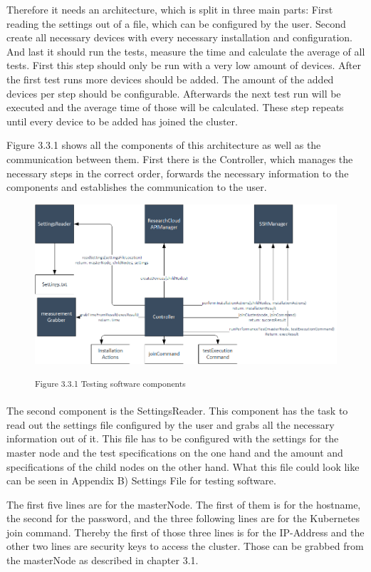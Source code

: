 Therefore it needs an architecture, which is split in three main parts: First reading the settings out of a file, which can be configured by the user. Second create all necessary devices with every necessary installation and configuration. And last it should run the tests, measure the time and calculate the average of all tests. First this step should only be run with a very low amount of devices. After the first test runs more devices should be added. The amount of the added devices per step should be configurable. Afterwards the next test run will be executed and the average time of those will be calculated. These step repeats until every device to be added has joined the cluster.

Figure 3.3.1 shows all the components of this architecture as well as the communication between them. First there is the Controller, which manages the necessary steps in the correct order, forwards the necessary information to the components and establishes the communication to the user.

\begin{figure}[h]
\centering
\includegraphics[width=\textwidth]{images/testing_software_components.png}

\textsuperscript{Figure 3.3.1 Testing software components}
\end{figure}

The second component is the SettingsReader. This component has the task to read out the settings file configured by the user and grabs all the necessary information out of it. This file has to be configured with the settings for the master node and the test specifications on the one hand and the amount and specifications of the child nodes on the other hand. What this file could look like can be seen in Appendix B) Settings File for testing software.

The first five lines are for the masterNode. The first of them is for the hostname, the second for the password, and the three following lines are for the Kubernetes join command. Thereby the first of those three lines is for the IP-Address and the other two lines are security keys to access the cluster. Those can be grabbed from the masterNode as described in chapter 3.1.

